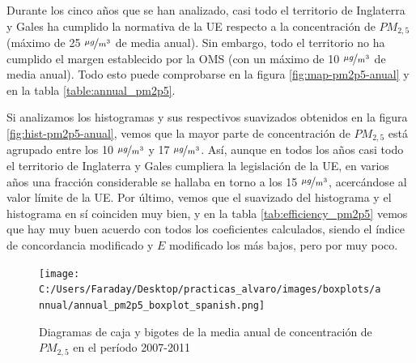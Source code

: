 \documentclass[12pt]{article}
\begin{document}
Durante los cinco años que se han analizado, casi todo el territorio de Inglaterra y Gales ha cumplido la normativa de la UE respecto a la concentración de $PM_{2,5}$ (máximo de 25 $\nicefrac{\mu g}{m^3}$ de media anual). Sin embargo, todo el territorio no ha cumplido el margen establecido por la OMS (con un máximo de 10 $\nicefrac{\mu g}{m^3}$ de media anual). Todo esto puede comprobarse en la figura \ref{fig:map-pm2p5-anual} y en la tabla \ref{table:annual_pm2p5}.

Si analizamos los histogramas y sus respectivos suavizados obtenidos en la figura \ref{fig:hist-pm2p5-anual}, vemos que la mayor parte de concentración de $PM_{2,5}$ está agrupado entre los 10 $\nicefrac{\mu g}{m^{3}}$ y 17 $\nicefrac{\mu g}{m^{3}}$. Así, aunque en todos los años casi todo el territorio de Inglaterra y Gales cumpliera la legislación de la UE,  en varios años una fracción considerable se hallaba en torno a los 15 $\nicefrac{\mu g}{m^{3}}$, acercándose al valor límite de la UE. Por último, vemos que el suavizado del histograma y el histograma en sí coinciden muy bien, y en la tabla \ref{tab:efficiency_pm2p5} vemos que hay muy buen acuerdo con todos los coeficientes calculados, siendo el índice de concordancia modificado y $E$ modificado los más bajos, pero por muy poco.

\begin{figure}[H]
\centering
\texttt{[image: C:/Users/Faraday/Desktop/practicas\_alvaro/images/boxplots/annual/annual\_pm2p5\_boxplot\_spanish.png]}
\caption{Diagramas de caja y bigotes de la media anual de concentración de $PM_{2,5}$ en el período 2007-2011}
\label{fig:box_pm2p5_annual}
\end{figure}
\end{document}

